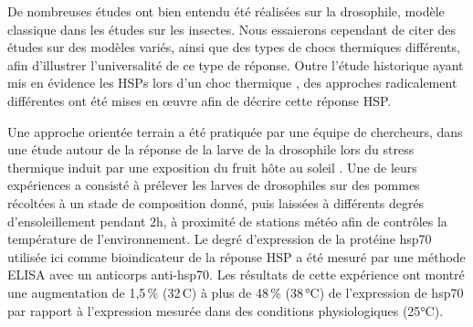 

		De nombreuses études ont bien entendu été réalisées sur la drosophile, modèle classique dans les études sur les insectes.
		Nous essaierons cependant de citer des études sur des modèles variés, ainsi que des types de chocs thermiques différents, afin d'illustrer l'universalité de ce type de réponse.
		Outre l'étude historique ayant mis en évidence les HSPs lors d'un choc thermique \cite{tissieres1974}, 
		des approches radicalement différentes ont été mises en \oe{}uvre afin de décrire cette réponse HSP.

		Une approche orientée terrain a été pratiquée par une équipe de chercheurs, dans une étude autour de la réponse de la larve de la drosophile lors du stress thermique induit par une exposition du fruit hôte au soleil \cite{feder1997}.
		Une de leurs expériences a consisté à prélever les larves de drosophiles sur des pommes récoltées à un stade de composition donné, puis laissées à différents degrés d'ensoleillement pendant 2h, à proximité de stations météo afin de contrôles la température de l'environnement.
		Le degré d'expression de la protéine hsp70 utilisée ici comme bioindicateur de la réponse HSP a été mesuré par une méthode ELISA avec un anticorps anti-hsp70.
		Les résultats de cette expérience ont montré une augmentation de 1,5\,\% (32\,\degres{}C) à plus de 48\,\% (38\,°C) de l'expression de hsp70 par rapport à l'expression mesurée dans des conditions physiologiques (25°C). %

